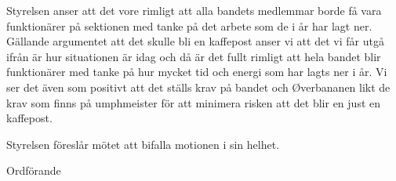 \documentclass[../_main/handlingar.tex]{subfiles}
\begin{document}
\motionssvar

Styrelsen anser att det vore rimligt att alla bandets medlemmar borde få vara funktionärer på sektionen med tanke på det arbete som de i år har lagt ner. Gällande argumentet att det skulle bli en kaffepost anser vi att det vi får utgå ifrån är hur situationen är idag och då är det fullt rimligt att hela bandet blir funktionärer med tanke på hur mycket tid och energi som har lagts ner i år. 
Vi ser det även som positivt att det ställs krav på bandet och Øverbananen likt de krav som finns på umphmeister för att minimera risken att det blir en just en kaffepost.

Styrelsen föreslår mötet att bifalla motionen i sin helhet.

\begin{signatures}{1}
    \ist
    \signature{\ordf}{Ordförande}
\end{signatures}
\end{document}
